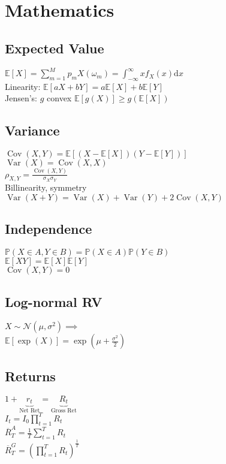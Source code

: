 \section{Mathematics}
	\subsection*{Expected Value}
	$\mathbb{E}\left[X\right] = \sum_{m = 1}^{M}p_{m}X\left(\omega_{m}\right) = \int_{-\infty}^{\infty}xf_{X}\left(x\right)\mathrm{d}x$\\
	Linearity: $\mathbb{E}\left[aX + bY\right] = a\mathbb{E}\left[X\right] + b\mathbb{E}\left[Y\right]$\\
	Jensen's: $g$ convex $\mathbb{E}\left[g(X)\right]\geq g\left(\mathbb{E}\left[X\right]\right)$
	
	\subsection*{Variance}
	$\operatorname{Cov}\left(X, Y\right) = \mathbb{E}\left[\left(X - \mathbb{E}\left[X\right]\right)\left(Y - \mathbb{E}\left[Y\right]\right)\right]$\\
	$\operatorname{Var}\left(X\right) = \operatorname{Cov}\left(X, X\right)$\\
	$\rho_{X, Y} = \frac{\operatorname{Cov}\left(X, Y\right)}{\sigma_{X}\sigma_{Y}}$\\
	Billinearity, symmetry\\
	$\operatorname{Var}\left(X + Y\right) = \operatorname{Var}\left(X\right) + \operatorname{Var}\left(Y\right) + 2\operatorname{Cov}\left(X, Y\right)$
	
	\subsection*{Independence}
	$\mathbb{P}\left(X\in A, Y\in B\right) = \mathbb{P}\left(X\in A\right)\mathbb{P}\left(Y\in B\right)$\\
	$\mathbb{E}\left[XY\right] = \mathbb{E}\left[X\right]\mathbb{E}\left[Y\right]$\\
	$\operatorname{Cov}\left(X, Y\right) = 0$
	
	\subsection*{Log-normal RV}
	$X\sim\mathcal{N}\left(\mu, \sigma^{2}\right)\implies$\\
	$\mathbb{E}\left[\exp\left(X\right)\right] = \exp\left(\mu + \frac{\sigma^{2}}{2}\right)$
	
	\subsection*{Returns}
	$1 + \underbrace{r_{t}}_{\text{Net Ret}} = \underbrace{R_{t}}_{\text{Gross Ret}}$\\
	$I_{t} = I_{0}\prod_{t = 1}^{T}R_{t}$\\
	$\overline{R}_{T}^{A} = \frac{1}{T}\sum_{t = 1}^{T}R_{t}$\\
	$\overline{R}_{T}^{G} = \left(\prod_{t = 1}^{T}R_{t}\right)^{\frac{1}{T}}$
